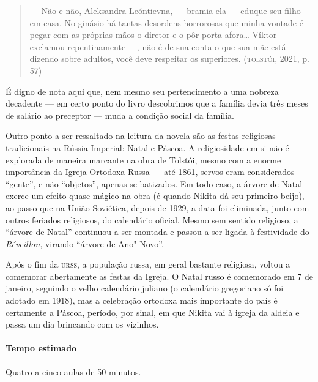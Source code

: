 \documentclass[11pt]{extarticle}
\begin{document}
\begin{quote}
--- Não e não, Aleksandra Leóntievna, --- bramia ela --- eduque seu
filho em casa. No ginásio há tantas desordens horrorosas que minha
vontade é pegar com as próprias mãos o diretor e o pôr porta afora\ldots{}
Víktor --- exclamou repentinamente ---, não é de sua conta o que sua mãe
está dizendo sobre adultos, você deve respeitar os superiores.
(\textsc{tolstói}, 2021, p. 57)
\end{quote}

É digno de nota aqui que, nem mesmo seu pertencimento a uma nobreza
decadente --- em certo ponto do livro descobrimos que a família devia
três meses de salário ao preceptor --- muda a condição social da
família.

Outro ponto a ser ressaltado na leitura da novela são as festas
religiosas tradicionais na Rússia Imperial: Natal e Páscoa. A
religiosidade em si não é explorada de maneira marcante na obra de
Tolstói, mesmo com a enorme importância da Igreja Ortodoxa Russa --- até
1861, servos eram considerados ``gente'', e não ``objetos'', apenas se
batizados. Em todo caso, a árvore de Natal exerce um efeito quase mágico
na obra (é quando Nikita dá seu primeiro beijo), ao passo que na União
Soviética, depois de 1929, a data foi eliminada, junto com outros
feriados religiosos, do calendário oficial. Mesmo sem sentido religioso,
a ``árvore de Natal'' continuou a ser montada e passou a ser ligada à
festividade do \emph{Réveillon}, virando ``árvore de Ano"-Novo''.


Após o fim da \textsc{urss}, a população russa, em geral bastante religiosa,
voltou a comemorar abertamente as festas da Igreja. O Natal russo é
comemorado em 7 de janeiro, seguindo o velho calendário juliano (o
calendário gregoriano só foi adotado em 1918), mas a celebração ortodoxa
mais importante do país é certamente a Páscoa, período, por sinal, em
que Nikita vai à igreja da aldeia e passa um dia brincando com os
vizinhos.


\paragraph{Tempo estimado} Quatro a cinco aulas de 50 minutos.
\end{document}
